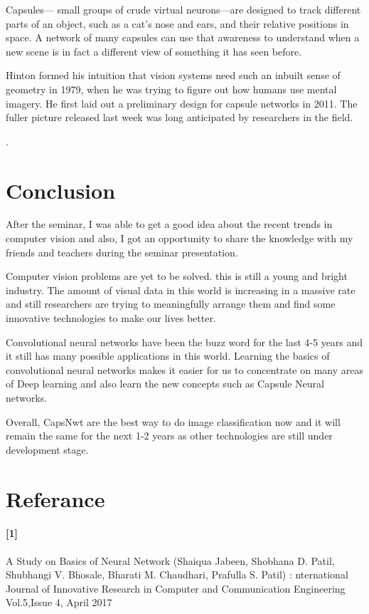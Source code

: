 \documentclass[12pt]{article}
\begin{document}
{{Capsules— small groups of crude virtual neurons—are designed to track different parts of an object, such as a cat’s nose and ears, and their relative positions in space. A network of many capsules can use that awareness to understand when a new scene is in fact a different view of something it has seen before.

Hinton formed his intuition that vision systems need such an inbuilt sense of geometry in 1979, when he was trying to figure out how humans use mental imagery. He first laid out a preliminary design for capsule networks in 2011. The fuller picture released last week was long anticipated by researchers in the field. 

\newpage
.%
\vspace{35mm}
\section*{\fontsize{14}{14}\selectfont Conclusion}

After the seminar, I was able to get a good idea about the recent trends in computer vision and also, I got an opportunity to share the knowledge with my friends and teachers during the seminar presentation.

Computer vision problems are yet to be solved. this is still a young and bright industry. The amount of visual data in this world is increasing in a massive rate and still researchers are trying to meaningfully arrange them and find some innovative technologies to make our lives better. 

Convolutional neural networks have been the buzz word for the last 4-5 years and it still has many possible applications in this world. Learning the basics of convolutional neural networks makes it easier for us to concentrate on many areas of Deep learning and also learn the new concepts such as Capsule Neural networks.

Overall, CapsNwt are the best way to do image classification now and it will remain the same for the next 1-2 years as other technologies are still under development stage.

\newpage
\section*{\fontsize{14}{14}\selectfont Referance}
\paragraph*{[1]}
A Study on Basics of Neural Network (Shaiqua Jabeen, Shobhana D. Patil, Shubhangi V. Bhosale, Bharati M. Chaudhari, Prafulla S. Patil) : nternational Journal of Innovative Research in Computer and Communication Engineering Vol.5,Issue 4, April 2017
}}
\end{document}
